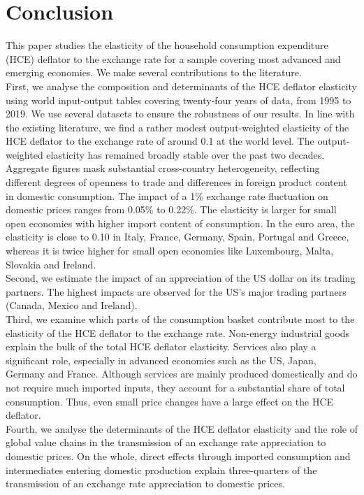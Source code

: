 \documentclass[11pt,a4paper]{paper} %
\begin{document}
\section{Conclusion}
\label{sec:ccl}
This paper studies the elasticity of the household consumption expenditure (HCE) deflator to the exchange rate for a sample covering most advanced and emerging economies.
We make several contributions to the literature. \\
First, we analyse the composition and determinants of the HCE deflator elasticity using world input-output tables covering twenty-four years of data, from 1995 to 2019. 
We use several datasets to ensure the robustness of our results.
In line with the existing literature, we find a rather modest output-weighted elasticity of the HCE deflator to the exchange rate of around 0.1 at the world level.
The output-weighted elasticity has remained broadly stable over the past two decades.
Aggregate figures mask substantial cross-country heterogeneity, reflecting different degrees of openness to trade and differences in foreign product content in domestic consumption. 
The impact of a 1\% exchange rate fluctuation on domestic prices ranges from 0.05\% to 0.22\%.
The elasticity is larger for small open economies with higher import content of consumption. 
In the euro area, the elasticity is close to 0.10 in Italy, France, Germany, Spain, Portugal and Greece, whereas it is twice higher for small open economies like Luxembourg, Malta, Slovakia and Ireland.\\
Second, we estimate the impact of an appreciation of the US dollar on its trading partners. 
The highest impacts are observed for the US’s major trading partners (Canada, Mexico and Ireland).\\
Third, we examine which parts of the consumption basket contribute most to the elasticity of the HCE deflator to the exchange rate. 
Non-energy industrial goods explain the bulk of the total HCE deflator elasticity. 
Services also play a significant role, especially in advanced economies such as the US, Japan, Germany and France.
Although services are mainly produced domestically and do not require much imported inputs, they account for a substantial share of total consumption.
Thus, even small price changes have a large effect on the HCE deflator. \\
Fourth, we analyse the determinants of the HCE deflator elasticity and the role of global value chains in the transmission of an exchange rate appreciation to domestic prices.
On the whole, direct effects through imported consumption and intermediates entering domestic production explain three-quarters of the transmission of an exchange rate appreciation to domestic prices.
\end{document}
